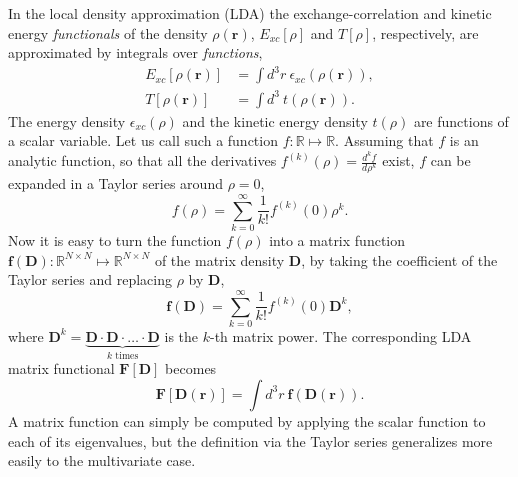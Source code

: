 \documentclass[journal=jacsat,manuscript=article]{achemso}
\newcommand\m[1]{\mathbf{#1}}
\renewcommand\vec[1]{\mathbf{#1}}
\begin{document}
In the local density approximation (LDA) the exchange-correlation and kinetic energy \emph{functionals} of the density $\rho(\vec{r})$,
$E_{xc}[\rho]$ and $T[\rho]$, respectively,
are approximated by integrals over \emph{functions},
\begin{align}
  E_{xc}[\rho(\vec{r})] &= \int d^3\!r ~ \epsilon_{xc}(\rho(\vec{r})), \\
  T[\rho(\vec{r})] &= \int d^3\! ~ t(\rho(\vec{r})).
\end{align}
The energy density $\epsilon_{xc}(\rho)$ and the kinetic energy density $t(\rho)$ are functions
of a scalar variable. Let us call such a function $f: \mathbb{R} \mapsto \mathbb{R}$.
Assuming that $f$ is an analytic function, so that all the derivatives $f^{(k)}(\rho) = \frac{d^k f}{d\rho^k}$ exist,
$f$ can be expanded in a Taylor series around $\rho=0$,
\begin{equation}
 f(\rho) = \sum_{k=0}^{\infty} \frac{1}{k!} f^{(k)}(0) \rho^k.
\end{equation}
Now it is easy to turn the function $f(\rho)$ into a matrix function $\m{f}(\m{D}) : \mathbb{R}^{N \times N} \mapsto \mathbb{R}^{N \times N}$
of the matrix density $\m{D}$, by taking the coefficient of the Taylor series and replacing $\rho$ by $\m{D}$,
\begin{equation}
 \m{f}(\m{D}) = \sum_{k=0}^{\infty} \frac{1}{k!} f^{(k)}(0) \m{D}^k,
\end{equation}
where $\m{D}^k = \underbrace{\m{D} \cdot \m{D} \cdot \ldots \cdot \m{D}}_{\text{$k$ times}}$ is the $k$-th matrix power.
The corresponding LDA matrix functional $\m{F}[\m{D}]$ becomes
\begin{equation}
 \m{F}[\m{D}(\vec{r})] = \int d^3\!r ~ \m{f}(\m{D}(\vec{r})).
\end{equation}
A matrix function can simply be computed by applying the scalar function to each of its eigenvalues, but the definition
via the Taylor series generalizes more easily to the multivariate case.
\end{document}
